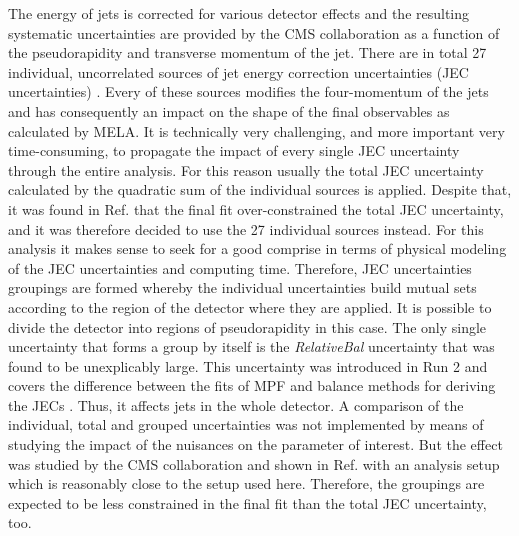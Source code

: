 The energy of jets is corrected for various detector effects and the resulting systematic uncertainties are provided by the 
CMS collaboration as a function of the pseudorapidity and transverse momentum of the jet. There are in total 27 individual, uncorrelated sources 
of jet energy correction uncertainties (JEC uncertainties)  \cite{Khachatryan:2016kdb}. Every of these sources modifies the four-momentum of the jets and has consequently an impact on the shape of the final observables as calculated by MELA.
It is technically very challenging, and more important very time-consuming, to propagate the impact of every single JEC uncertainty through the entire analysis.   
For this reason usually the total JEC uncertainty calculated by the quadratic sum of the individual sources is applied.
Despite that, it was found in Ref. \cite{Sirunyan:2017khh} that the final fit over-constrained the total JEC uncertainty, and it was therefore decided to use the 27
individual sources instead.
For this analysis it makes sense to seek for a good comprise in terms of physical modeling of the JEC uncertainties and computing time.
Therefore, JEC uncertainties groupings are formed  whereby the individual uncertainties
build mutual sets according to the region of the detector where they are applied. It is possible to divide the detector into regions of pseudorapidity in this case.
The only single uncertainty that forms a group by itself is the \textit{RelativeBal} uncertainty that was found to be unexplicably large. This uncertainty was introduced
in Run 2 and covers the difference between the fits of MPF and \pt{} balance methods for deriving the JECs \cite{relativeBal}. Thus, it affects jets in the whole detector.
A comparison of the individual, total and grouped uncertainties was not implemented by means of studying the impact of the nuisances on the 
parameter of interest. But the effect was studied by the CMS collaboration and shown in Ref. \cite{jec_groupings} with an analysis setup which is reasonably close to the
setup used here. Therefore, the groupings are expected to be less constrained in the final fit than the total JEC uncertainty, too.

